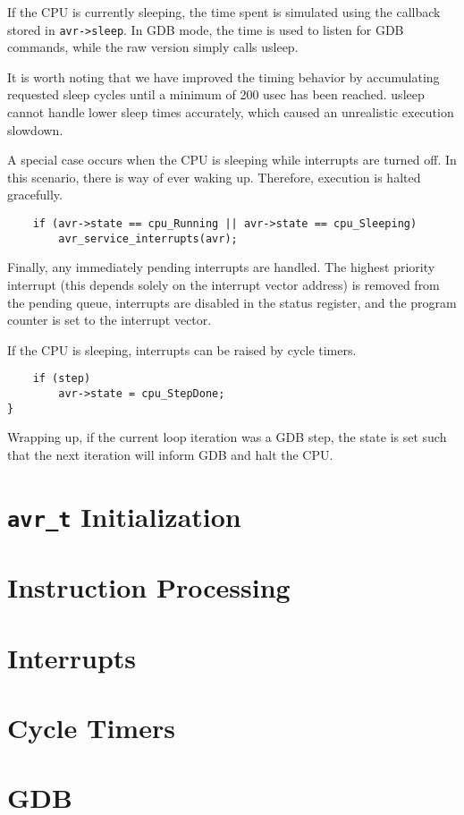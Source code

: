 If the CPU is currently sleeping, the time spent is simulated using the callback
stored in \lstinline|avr->sleep|. In GDB mode, the time is used to listen for
GDB commands, while the raw version simply calls usleep.

It is worth noting that
we have improved the timing behavior by accumulating requested sleep cycles until
a minimum of 200 usec has been reached. usleep cannot handle lower sleep times
accurately, which caused an unrealistic execution slowdown.

A special case occurs when the CPU is sleeping while interrupts are turned off.
In this scenario, there is way of ever waking up. Therefore, execution is halted
gracefully.

\begin{lstlisting}
    if (avr->state == cpu_Running || avr->state == cpu_Sleeping)
        avr_service_interrupts(avr);
\end{lstlisting}

Finally, any immediately pending interrupts are handled. The highest priority
interrupt (this depends solely on the interrupt vector address) is removed from
the pending queue, interrupts are disabled in the status register, and the
program counter is set to the interrupt vector.

If the CPU is sleeping, interrupts can be raised by cycle timers.

\begin{lstlisting}
    if (step)
        avr->state = cpu_StepDone;
}
\end{lstlisting}

Wrapping up, if the current loop iteration was a GDB step, the state is set
such that the next iteration will inform GDB and halt the CPU.

\section{\lstinline|avr_t| Initialization}
\section{Instruction Processing}
\section{Interrupts}
\section{Cycle Timers}
\section{GDB}
